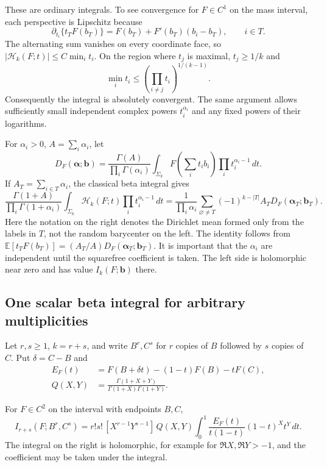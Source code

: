 These are ordinary integrals.  To see convergence for $F\in C^1$
on the mass interval, each perspective is Lipschitz because
\[
 \partial_{t_i}\{t_TF(b_T)\}
    =F(b_T)+F'(b_T)(b_i-b_T),\qquad i\in T.
\]
The alternating sum vanishes on every coordinate face, so
$|\mathcal H_k(F;t)|\le C\min_i t_i$.
On the region where $t_j$ is maximal, $t_j\ge1/k$ and
\[
 \min_i t_i\le\left(\prod_{i\ne j}t_i\right)^{1/(k-1)}.
\]
Consequently the integral is absolutely convergent.  The same argument
allows sufficiently small independent complex powers $t_i^{\alpha_i}$
and any fixed powers of their logarithms.

For $\alpha_i>0$, $A=\sum_i\alpha_i$, let
\[
 D_F(\boldsymbol\alpha;\boldsymbol b)
   =\frac{\Gamma(A)}{\prod_i\Gamma(\alpha_i)}
      \int_{\Sigma_k}F\!\left(\sum_i t_i b_i\right)
                            \prod_i t_i^{\alpha_i-1}\,dt.
\]
If $A_T=\sum_{i\in T}\alpha_i$, the classical beta integral
\cite{dlmfbeta} gives
\begin{equation}\label{tc:eq:independent-regulators}
 \frac{\Gamma(1+A)}{\prod_i\Gamma(1+\alpha_i)}
 \int_{\Sigma_k}\mathcal H_k(F;t)
                     \prod_i t_i^{\alpha_i-1}\,dt
 =\frac{1}{\prod_i\alpha_i}
   \sum_{\varnothing\ne T}(-1)^{k-|T|}
                  A_TD_F(\boldsymbol\alpha_T;\boldsymbol b_T).
\end{equation}
Here the notation on the right denotes the Dirichlet mean formed
only from the labels in $T$, not the random barycenter on the left.
The identity follows from
$\mathbb E[t_TF(b_T)]=(A_T/A)D_F(\boldsymbol\alpha_T;\boldsymbol b_T)$.
It is important that the $\alpha_i$ are independent until the
squarefree coefficient is taken.  The left side is holomorphic near
zero and has value $I_k(F;\boldsymbol b)$ there.

\subsection{One scalar beta integral for arbitrary multiplicities}

Let $r,s\ge1$, $k=r+s$, and write $B^r,C^s$ for $r$ copies of
$B$ followed by $s$ copies of $C$.  Put $\delta=C-B$ and
\begin{align}
 E_F(t)&=F(B+\delta t)-(1-t)F(B)-tF(C),\label{tc:eq:chord}\\
 Q(X,Y)&=\frac{\Gamma(1+X+Y)}{\Gamma(1+X)\Gamma(1+Y)}.
                                                     \label{tc:eq:Q}
\end{align}

\begin{theorem}
\label{tc:thm:beta}
For $F\in C^2$ on the interval with endpoints $B,C$,
\begin{equation}\label{tc:eq:beta-representation}
 \boxed{\displaystyle
 I_{r+s}(F;B^r,C^s)
   =r!s!\,[X^{r-1}Y^{s-1}]\,
      Q(X,Y)\int_0^1
      \frac{E_F(t)}{t(1-t)}(1-t)^X t^Y\,dt.}
\end{equation}
The integral on the right is holomorphic, for example for
$\Re X,\Re Y>-1$, and the coefficient may be taken under the integral.
\end{theorem}

